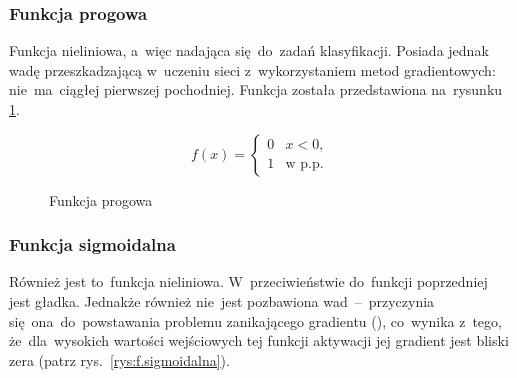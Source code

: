 \subsubsection{Funkcja progowa}
Funkcja nieliniowa, a~więc nadająca się~do~zadań klasyfikacji. Posiada jednak wadę przeszkadzającą w~uczeniu sieci
z~wykorzystaniem metod gradientowych: nie~ma~ciągłej pierwszej pochodniej. Funkcja została przedstawiona na~rysunku
\ref{rys:f.progowa}.

\begin{minipage}[t]{\textwidth}
\begin{equation}
	f(x) =
	\begin{cases}
	0 & x<0, \\
	1 & \textrm{w p.p.}
	\end{cases}
\end{equation}

\begin{figure}[H]
    \centering
    \caption{Funkcja progowa}
    \label{rys:f.progowa}
\end{figure}
\end{minipage}

\subsubsection{Funkcja sigmoidalna}
Również jest to~funkcja nieliniowa. W~przeciwieństwie do~funkcji poprzedniej jest gładka. Jednakże również nie~jest
pozbawiona wad~--~przyczynia się~ona~do~powstawania problemu zanikającego gradientu (\cite{vanishing-gradient}),
co~wynika z~tego, że~dla~wysokich wartości wejściowych tej funkcji aktywacji jej gradient jest bliski zera (patrz
rys.~\ref{rys:f.sigmoidalna}).

